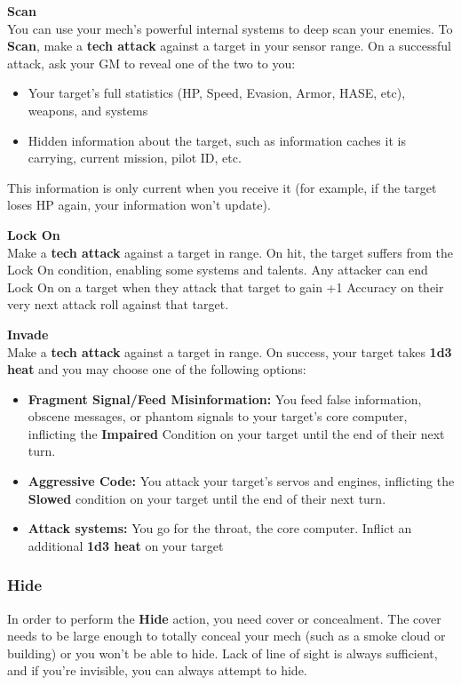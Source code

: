 \textbf{Scan}\\
You can use your mech’s powerful internal systems to deep scan your enemies.
To \textbf{Scan}, make a \textbf{tech attack} against a target in your sensor range. On a successful attack, ask your GM to reveal one of the two to you:
\begin{itemize}
    \item Your target’s full statistics (HP, Speed, Evasion, Armor, HASE, etc), weapons, and systems
    \item Hidden information about the target, such as information caches it is carrying, current mission, pilot ID, etc. 
\end{itemize}
This information is only current when you receive it (for example, if the target loses HP again, your information won’t update).

\textbf{Lock On}\\
Make a \textbf{tech attack} against a target in range. On hit, the target suffers from the Lock On condition, enabling some systems and talents. Any attacker can end Lock On on a target when they attack that target to gain +1 Accuracy on their very next attack roll against that target.

\textbf{Invade}\\
Make a \textbf{tech attack} against a target in range. On success, your target takes \textbf{1d3 heat} and you may choose one of the following options:
\begin{itemize}
\item \textbf{Fragment Signal/Feed Misinformation:} You feed false information, obscene messages, or phantom signals to your target’s core computer, inflicting the \textbf{Impaired} Condition on your target until the end of their next turn.
\item \textbf{Aggressive Code:} You attack your target’s servos and engines, inflicting the \textbf{Slowed} condition on your target until the end of their next turn.
\item \textbf{Attack systems:} You go for the throat, the core computer. Inflict an additional \textbf{1d3 heat} on your target
\end{itemize}


\subsubsection{Hide}

In order to perform the \textbf{Hide} action, you need cover or concealment. The cover needs to be large enough to totally conceal your mech (such as a smoke cloud or building) or you won’t be able to hide. Lack of line of sight is always sufficient, and if you’re invisible, you can always attempt to hide.

